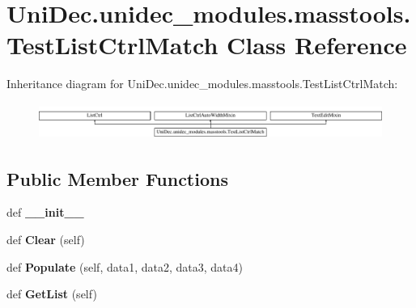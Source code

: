 \hypertarget{class_uni_dec_1_1unidec__modules_1_1masstools_1_1_test_list_ctrl_match}{}\section{Uni\+Dec.\+unidec\+\_\+modules.\+masstools.\+Test\+List\+Ctrl\+Match Class Reference}
\label{class_uni_dec_1_1unidec__modules_1_1masstools_1_1_test_list_ctrl_match}
Inheritance diagram for Uni\+Dec.\+unidec\+\_\+modules.\+masstools.\+Test\+List\+Ctrl\+Match\+:\begin{figure}[H]
\begin{center}
\leavevmode
\includegraphics[height=1.185185cm]{class_uni_dec_1_1unidec__modules_1_1masstools_1_1_test_list_ctrl_match}
\end{center}
\end{figure}
\subsection*{Public Member Functions}
\begin{DoxyCompactItemize}
\item 
\hypertarget{class_uni_dec_1_1unidec__modules_1_1masstools_1_1_test_list_ctrl_match_a601fc2972c1f3e6d17a89a2501407b47}{}def {\bfseries \+\_\+\+\_\+init\+\_\+\+\_\+}\label{class_uni_dec_1_1unidec__modules_1_1masstools_1_1_test_list_ctrl_match_a601fc2972c1f3e6d17a89a2501407b47}

\item 
\hypertarget{class_uni_dec_1_1unidec__modules_1_1masstools_1_1_test_list_ctrl_match_abeea68a6170321188e5bbdb97fc7802c}{}def {\bfseries Clear} (self)\label{class_uni_dec_1_1unidec__modules_1_1masstools_1_1_test_list_ctrl_match_abeea68a6170321188e5bbdb97fc7802c}

\item 
\hypertarget{class_uni_dec_1_1unidec__modules_1_1masstools_1_1_test_list_ctrl_match_ab4c702233b635e0bca607c3cf00cb7fa}{}def {\bfseries Populate} (self, data1, data2, data3, data4)\label{class_uni_dec_1_1unidec__modules_1_1masstools_1_1_test_list_ctrl_match_ab4c702233b635e0bca607c3cf00cb7fa}

\item 
\hypertarget{class_uni_dec_1_1unidec__modules_1_1masstools_1_1_test_list_ctrl_match_a6df939ce53f7a67a8b4f50443d28cc2f}{}def {\bfseries Get\+List} (self)\label{class_uni_dec_1_1unidec__modules_1_1masstools_1_1_test_list_ctrl_match_a6df939ce53f7a67a8b4f50443d28cc2f}

\end{DoxyCompactItemize}
